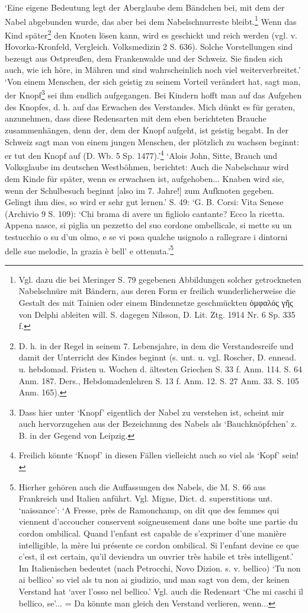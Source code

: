 \documentclass[a4paper, 11pt, oneside]{article}
\begin{document}
`Eine eigene Bedeutung legt der Aberglaube dem Bändchen bei, mit dem der Nabel abgebunden wurde, das aber bei dem Nabelschnurreste bleibt.\footnote{Vgl. dazu die bei Meringer S. 79 gegebenen Abbildungen solcher getrockneten Nabelschnüre mit Bändern, aus deren Form er freilich wunderlicherweise die Gestalt des mit Tainien oder einem Bindennetze geschmückten ὀμφαλός γῆς von Delphi ableiten will. S. dagegen Nilsson, D. Lit. Ztg. 1914 Nr. 6 Sp. 335 f.} Wenn das Kind später\footnote{D. h. in der Regel in seinem 7. Lebensjahre, in dem die Verstandesreife und damit der Unterricht des Kindes beginnt (s. unt. u. vgl. Roscher, D. ennead. u. hebdomad. Fristen u. Wochen d. ältesten Griechen S. 33 f. Anm. 114. S. 64 Anm. 187. Ders., Hebdomadenlehren S. 13 f. Anm. 12. S. 27 Anm. 33. S. 105 Anm. 165).} den Knoten lösen kann, wird es geschickt und reich werden (vgl. v. Hovorka-Kronfeld, Vergleich. Volksmedizin 2 S. 636). Solche Vorstellungen sind bezeugt aus Ostpreußen, dem Frankenwalde und der Schweiz. Sie finden sich auch, wie ich höre, in Mähren und sind wahrscheinlich noch viel weiterverbreitet.' `Von einem Menschen, der sich geistig zu seinem Vorteil verändert hat, sagt man, der Knopf\footnote{Dass hier unter `Knopf' eigentlich der Nabel zu verstehen ist, scheint mir auch hervorzugehen aus der Bezeichnung des Nabels als `Bauchknöpfchen' z. B. in der Gegend von Leipzig.} sei ihm endlich aufgegangen. Bei Kindern hofft man auf das Aufgehen des Knopfes, d. h. auf das Erwachen des Verstandes. Mich dünkt es für geraten, anzunehmen, dass diese Redensarten mit dem eben berichteten Brauche zusammenhängen, denn der, dem der Knopf aufgeht, ist geistig begabt. In der Schweiz sagt man von einem jungen Menschen, der plötzlich zu wachsen beginnt: er tut den Knopf auf (D. Wb. 5 Sp. 1477).'\footnote{Freilich könnte `Knopf' in diesen Fällen vielleicht auch so viel als `Kopf' sein!} `Alois John, Sitte, Brauch und Volksglaube im deutschen Westböhmen, berichtet: Auch die Nabelschnur wird dem Kinde für später, wenn es erwachsen ist, aufgehoben... Knaben wird sie, wenn der Schulbesuch beginnt [also im 7. Jahre!] zum Aufknoten gegeben. Gelingt ihm dies, so wird er sehr gut lernen.' S. 49: `G. B. Corsi: Vita Senese (Archivio 9 S. 109): `Chi brama di avere un figliolo cantante? Ecco la ricetta. Appena nasce, si piglia un pezzetto del suo cordone ombellicale, si mette su un testucchio o su d'un olmo, e se vi posa qualche usignolo a rallegrare i dintorni delle sue melodie, la grazia è bell' e ottenuta.'\footnote{Hierher gehören auch die Auffassungen des Nabels, die M. S. 66 aus Frankreich und Italien anführt. Vgl. Migne, Dict. d. superstitions unt. `naissance': `A Fresse, près de Ramonchamp, on dit que des femmes qui viennent d'accoucher conservent soigneusement dans une boîte une partie du cordon ombilical. Quand l'enfant est capable de s'exprimer d'une manière intelligible, la mère lui présente ce cordon ombilical. Si l'enfant devine ce que c'est, il est certain, qu'il deviendra un ouvrier très habile et très intelligent.' Im Italienischen bedeutet (nach Petrocchi, Novo Dizion. s. v. bellico) `Tu non ai bellico' so viel als tu non ai giudizio, und man sagt von dem, der keinen Verstand hat `aver l'osso nel bellico.' Vgl. auch die Redensart `Che mi caschi il bellico, se'... = Da könnte man gleich den Verstand verlieren, wenn...}
\end{document}
